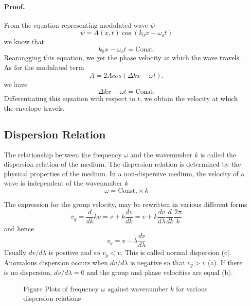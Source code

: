 \documentclass[../../../main.tex]{subfiles}
\begin{document}
\paragraph{Proof.} From the equation representing modulated wave $\psi$
\begin{equation*}
    \psi=A(x, t) \cos(k_0x - \omega_ot) 
\end{equation*}
we know that 
\begin{equation*}
    k_0x - \omega_ot=\text{Const.}
\end{equation*}
Rearangging this equation, we get the phase velocity at which the wave travels. As for the modulated term
\begin{equation*}
    A=2A cos( \Delta k x- \omega t).
\end{equation*}
we have 
\begin{equation*}
    \Delta k x- \omega t=\text{Const.}
\end{equation*}
Differentiating this equation with respect to $t$, we obtain the velocity at which the envelope travels.

\subsection{Dispersion Relation}
The relationship between the frequency $\omega$ and the wavenumber $k$ is called the dispersion relation of the medium. The dispersion relation is determined by the physical properties of the medium. In a non-dispersive medium, the velocity of a wave is independent of the wavenumber $k$
\begin{equation*}
    \omega=\text{Const.}\times k
\end{equation*}

The expression for the group velocity, may be rewritten in various different forms
\begin{equation*}
    v_g=\frac{d}{dk}kv=v+k\frac{dv}{dk}=v+k\frac{dv}{d\lambda}\frac{d}{dk} \frac{2\pi}{k}
\end{equation*}
and hence
\begin{equation*}
    v_g=v-\lambda\frac{dv}{d\lambda}
\end{equation*}
Usually $dv/d\lambda$ is positive and so $v_g < v$. This is called normal dispersion (c). Anomalous dispersion occurs when $dv/d\lambda$ is negative so that $v_g > v$ (a). If there is no dispersion, $dv/d\lambda = 0$ and the group and phase velocities are equal (b).
\begin{figure*}
    \centering
    \caption*{Figure Plots of frequency $\omega$ against wavenumber $k$ for various dispersion relations}
\end{figure*}
\end{document}
